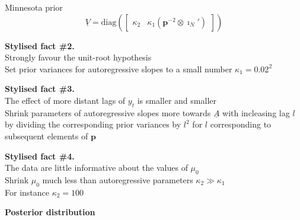 \documentclass[notes,blackandwhite,mathsans,usenames,dvipsnames]{beamer}
\begin{document}
\begin{frame}{Minnesota prior}
\small
$$
\underline{V}=\text{diag}\left(\begin{bmatrix}\kappa_2& \kappa_1\left(\mathbf{p}^{-2}\otimes\imath_N'\right)\end{bmatrix}\right) $$

\bigskip\textbf{Stylised fact \#2.}\\
Strongly favour the unit-root hypothesis \\
{\color{mcxs2}Set prior variances for autoregressive slopes to a small number} $\kappa_1=0.02^2$

\bigskip\textbf{Stylised fact \#3.}\\
The effect of more distant lags of $y_t$ is smaller and smaller\\
{\color{mcxs2}Shrink parameters of autoregressive slopes more towards} $\underline{A}$ {\color{mcxs2}with incleasing lag} $l$ {\color{mcxs2}by dividing the corresponding prior variances by} $l^2$ {\color{mcxs2}for} $l$ {\color{mcxs2}corresponding to subsequent elements of} $\mathbf{p}$

\bigskip\textbf{Stylised fact \#4.}\\
The data are little informative about the values of $\mu_0$ \\
{\color{mcxs2}Shrink $\mu_0$ much less than autoregressive parameters} $\kappa_2\gg\kappa_1$\\ {\color{mcxs2}For instance }$\kappa_2=100$

\end{frame}





{
\begin{frame}

\begin{adjustwidth}{-0.5cm}{0cm}
\vspace{8.3cm}\Large
\textbf{{\color{mcxs1}Posterior} {\color{mcxs5}distribution}}
\end{adjustwidth}

\end{frame}
}
\end{document}
